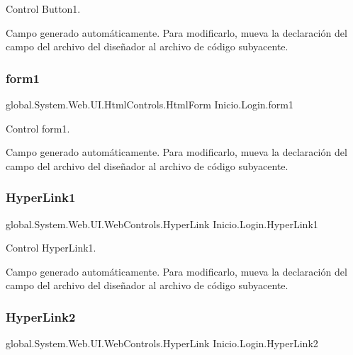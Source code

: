 Control Button1. 

Campo generado automáticamente. Para modificarlo, mueva la declaración del campo del archivo del diseñador al archivo de código subyacente. \mbox{\label{classInicio_1_1Login_a52e65c9e6119c96fb9e7efb178a72214}} 
\subsubsection{\texorpdfstring{form1}{form1}}
{\footnotesize\ttfamily global.\+System.\+Web.\+U\+I.\+Html\+Controls.\+Html\+Form Inicio.\+Login.\+form1\hspace{0.3cm}{\ttfamily [protected]}}



Control form1. 

Campo generado automáticamente. Para modificarlo, mueva la declaración del campo del archivo del diseñador al archivo de código subyacente. \mbox{\label{classInicio_1_1Login_a3370ab8441b3a73d003560dcbcaff0d9}} 
\subsubsection{\texorpdfstring{HyperLink1}{HyperLink1}}
{\footnotesize\ttfamily global.\+System.\+Web.\+U\+I.\+Web\+Controls.\+Hyper\+Link Inicio.\+Login.\+Hyper\+Link1\hspace{0.3cm}{\ttfamily [protected]}}



Control Hyper\+Link1. 

Campo generado automáticamente. Para modificarlo, mueva la declaración del campo del archivo del diseñador al archivo de código subyacente. \mbox{\label{classInicio_1_1Login_a51395541b60da1b91a7cbbd240b4c0f3}} 
\subsubsection{\texorpdfstring{HyperLink2}{HyperLink2}}
{\footnotesize\ttfamily global.\+System.\+Web.\+U\+I.\+Web\+Controls.\+Hyper\+Link Inicio.\+Login.\+Hyper\+Link2\hspace{0.3cm}{\ttfamily [protected]}}



